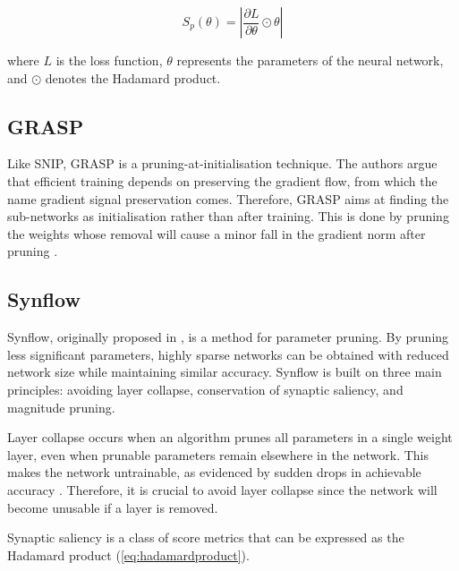 \begin{equation}
S_p(\theta) = \left|\frac{\partial L}{\partial \theta} \odot \theta\right|
\end{equation}

where $L$ is the loss function, \(\theta \) represents the parameters of the neural network, and \(\odot\) denotes the Hadamard product.

\subsection{GRASP}
Like SNIP, \gls{GRASP} is a pruning-at-initialisation technique. The authors argue that efficient training depends on preserving the gradient flow, from which the name gradient signal preservation comes. Therefore, GRASP aims at finding the sub-networks as initialisation rather than after training. This is done by pruning the weights whose removal will cause a minor fall in the gradient norm after pruning \autocite{wang2020picking}. 


\subsection{Synflow}
\gls{Synflow}, originally proposed in \autocite{tanaka2020pruning}, is a method for parameter pruning. By pruning less significant parameters, highly sparse networks can be obtained with reduced network size while maintaining similar accuracy. Synflow is built on three main principles: avoiding layer collapse, conservation of synaptic saliency, and magnitude pruning.

\noindent Layer collapse occurs when an algorithm prunes all parameters in a single weight layer, even when prunable parameters remain elsewhere in the network. This makes the network untrainable, as evidenced by sudden drops in achievable accuracy \autocite{tanaka2020pruning}. Therefore, it is crucial to avoid layer collapse since the network will become unusable if a layer is removed.

\noindent Synaptic saliency is a class of score metrics that can be expressed as the Hadamard product (\cref{eq:hadamardproduct}).

